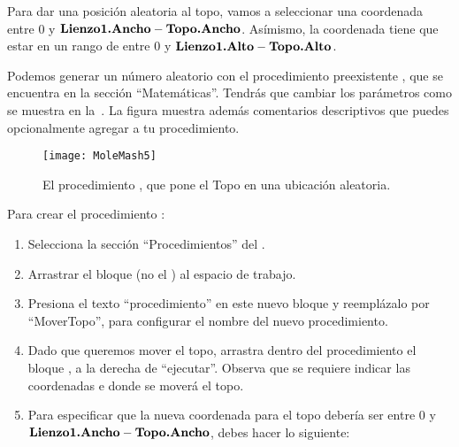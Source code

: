 Para dar una posición aleatoria al topo, vamos a seleccionar una
coordenada  entre 0 y $\textbf{Lienzo1.Ancho} -
\textbf{Topo.Ancho}$. Asímismo, la
coordenada  tiene que estar en un rango de entre 0 y
$\textbf{Lienzo1.Alto} - \textbf{Topo.Alto}$. {Podemos generar un número aleatorio con el procedimiento
preexistente , que se encuentra en la
sección ``Matemáticas''. Tendrás que cambiar los parámetros como se
muestra en la~. La figura muestra además
comentarios descriptivos que puedes opcionalmente agregar a tu
procedimiento.

\begin{figure}[H]
\vspace{3em}
\centering
\texttt{[image: MoleMash5]}
\caption{El procedimiento , que pone el Topo en
  una ubicación aleatoria.}
\label{fig:MoleMash5}
\end{figure}

Para crear el procedimiento :

\begin{enumerate}

\item Selecciona la sección ``Procedimientos'' del \blockEditor.

\item Arrastrar el bloque  (no el
  ) al espacio de trabajo.

\item Presiona el texto ``procedimiento'' en este nuevo bloque y
  reemplázalo por ``MoverTopo'', para configurar el nombre del nuevo
  procedimiento.

\item Dado que queremos mover el topo, arrastra dentro del
  procedimiento el bloque , a la derecha de
  ``ejecutar''. Observa que se requiere indicar las
  coordenadas  e  donde se moverá el topo.

\item Para especificar que la nueva coordenada  para el topo debería ser
  entre 0 y $\textbf{Lienzo1.Ancho} -  \textbf{Topo.Ancho}$, debes hacer lo siguiente:

\begin{itemize}


\end{itemize}
\end{enumerate}}
